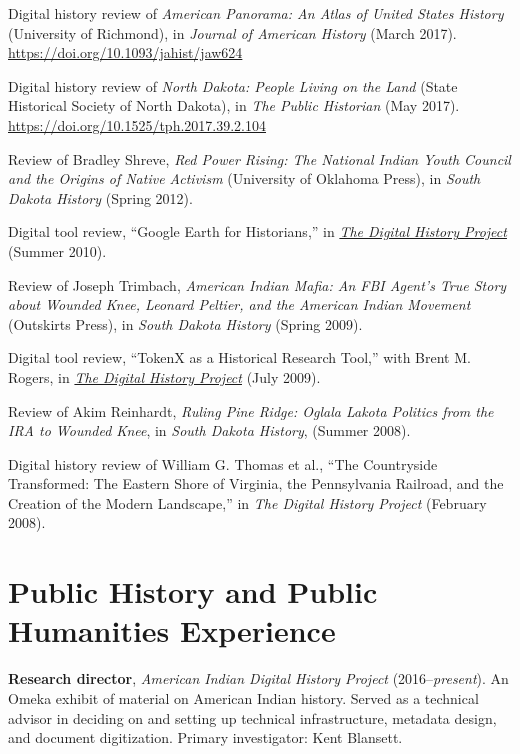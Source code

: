 Digital history review of \emph{American Panorama: An Atlas of United
States History} (University of Richmond), in \emph{Journal of American
History} (March 2017). \url{https://doi.org/10.1093/jahist/jaw624}

Digital history review of \emph{North Dakota: People Living on the Land}
(State Historical Society of North Dakota), in \emph{The Public
Historian} (May 2017). \url{https://doi.org/10.1525/tph.2017.39.2.104}

Review of Bradley Shreve, \emph{Red Power Rising: The National Indian
Youth Council and the Origins of Native Activism} (University of
Oklahoma Press), in \emph{South Dakota History} (Spring 2012).

Digital tool review, ``Google Earth for Historians,'' in
\emph{\href{http://digitalhistory.unl.edu/t-reviews/geheppler.php}{The
Digital History Project}} (Summer 2010).

Review of Joseph Trimbach, \emph{American Indian Mafia: An FBI Agent's
True Story about Wounded Knee, Leonard Peltier, and the American Indian
Movement} (Outskirts Press), in \emph{South Dakota History} (Spring
2009).

Digital tool review, ``TokenX as a Historical Research Tool,'' with
Brent M. Rogers, in
\emph{\href{http://digitalhistory.unl.edu/t-reviews/tokenxhepplerrogers.php}{The
Digital History Project}} (July 2009).

Review of Akim Reinhardt, \emph{Ruling Pine Ridge: Oglala Lakota
Politics from the IRA to Wounded Knee}, in \emph{South Dakota History},
(Summer 2008).

Digital history review of William G. Thomas et al., ``The Countryside
Transformed: The Eastern Shore of Virginia, the Pennsylvania Railroad,
and the Creation of the Modern Landscape,'' in \emph{The Digital History
Project} (February 2008).

\section{Public History and Public Humanities
Experience}\label{public-history-and-public-humanities-experience}

\textbf{Research director}, \emph{American Indian Digital History
Project} (2016--\emph{present}). An Omeka exhibit of material on
American Indian history. Served as a technical advisor in deciding on
and setting up technical infrastructure, metadata design, and document
digitization. Primary investigator: Kent Blansett.

